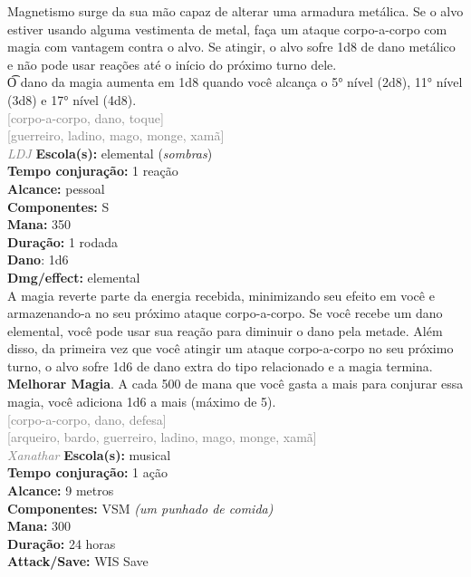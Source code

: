 \documentclass{RPG_Adventure}[2021/10/20]
\begin{document}
{\normalsize Magnetismo surge da sua mão capaz de alterar uma armadura metálica. Se o alvo estiver usando alguma vestimenta de metal, faça um ataque corpo-a-corpo com magia com vantagem contra o alvo. Se atingir, o alvo sofre 1d8 de dano metálico e não pode usar reações até o início do próximo turno dele.\\\t O dano da magia aumenta em 1d8 quando você alcança o 5° nível (2d8), 11° nível (3d8) e 17° nível (4d8).\\}
{\scriptsize \textcolor{gray}{[corpo-a-corpo, dano, toque]\\}}
{\scriptsize \textcolor{gray}{[guerreiro, ladino, mago, monge, xamã]\\}}
{\tiny \textcolor{gray}{\textit{LDJ}}}\jump{}
{\small \t \textbf{Escola(s):} elemental (\textit{sombras})\\\t \textbf{Tempo conjuração:} 1 reação\\\t \textbf{Alcance:} pessoal\\\t \textbf{Componentes:} S\\\t \textbf{Mana:} 350\\\t \textbf{Duração:} 1 rodada\\\t \textbf{Dano}: 1d6\\\t \textbf{Dmg/effect:} elemental\\}
{\normalsize A magia reverte parte da energia recebida, minimizando seu efeito em você e armazenando-a no seu próximo ataque corpo-a-corpo. Se você recebe um dano elemental, você pode usar sua reação para diminuir o dano pela metade. Além disso, da primeira vez que você atingir um ataque corpo-a-corpo no seu próximo turno, o alvo sofre 1d6 de dano extra do tipo relacionado e a magia termina.\\\t \textbf{Melhorar Magia}. A cada 500 de mana que você gasta a mais para conjurar essa magia, você adiciona 1d6 a mais (máximo de 5).\\}
{\scriptsize \textcolor{gray}{[corpo-a-corpo, dano, defesa]\\}}
{\scriptsize \textcolor{gray}{[arqueiro, bardo, guerreiro, ladino, mago, monge, xamã]\\}}
{\tiny \textcolor{gray}{\textit{Xanathar}}}\jump{}
{\small \t \textbf{Escola(s):} musical\\\t \textbf{Tempo conjuração:} 1 ação\\\t \textbf{Alcance:} 9 metros\\\t \textbf{Componentes:} VSM \textit{(um punhado de comida)}\\\t \textbf{Mana:} 300\\\t \textbf{Duração:} 24 horas\\\t \textbf{Attack/Save:} WIS Save\\}
\end{document}
